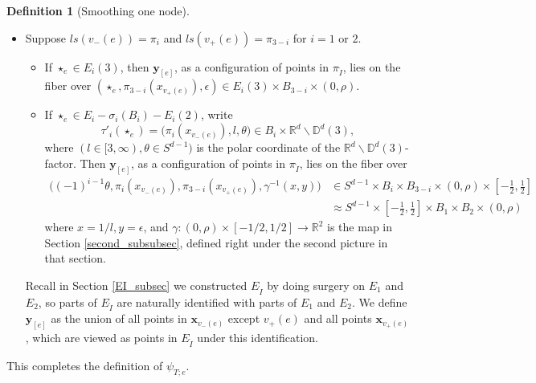 \documentclass[11pt]{article}
\theoremstyle{definition}
\newtheorem{dfn}[thm]{Definition}
\theoremstyle{remark}
\def\R{\mathbb{R}}
\def\D{\mathbb{D}}
\def\rI{{\mathring{I}}}
\def\bx{\mathbf{x}}
\def\by{\mathbf{y}}
\def\tn#1{\textnormal{#1}}
\begin{document}
\begin{dfn}[Smoothing one node]
\begin{itemize}
\[\begin{cases}
\tau'_i \quad \tn{ if }ls(v_+(e))=\pi_i, i=1 \tn{ or } 2, \tn{ and } ls(>v_+(e))=\emptyset \\
\hat\tau'_i \quad \tn{ if }ls(v_+(e))=\pi_i, i=1 \tn{ or } 2, \tn{ and } ls(>v_+(e))=\{\pi_{3-i}\} \\
\tau_\rI \quad \tn{ if }ls(v_+(e))=\pi_\rI. 
\end{cases}
\]
\item[(d)]
Suppose $ls(v_-(e))=\pi_{i}$ and $ls(v_+(e))=\pi_{3-i}$ for  $i=1$ or $2$.
\begin{itemize}
\item
If $\star_e\in E_{i}(3)$, 
then $\by_{[e]}$, as a configuration of points in $\pi_\rI$, lies on the fiber over
$(\star_e,\pi_{3-i}(x_{v_+(e)}),\epsilon)\in E_i(3)\times B_{3-i}\times(0,\rho)$.
\item
If $\star_e\in E_{i}-\sigma_{i}(B_i)-E_{i}(2)$, write 
\[
\tau'_i(\star_e)=\big(\pi_i(x_{v_-(e)}),l,\theta\big)\in B_i\times \R^d\backslash\D^d(3),
\]
where $(l\in[3,\infty), \theta\in S^{d-1})$ is the polar coordinate of the $\R^d\backslash\D^d(3)$-factor.
Then $\by_{[e]}$, as a configuration of points in $\pi_\rI$, lies on the fiber over
\begin{align*}
\big((-1)^{i-1}\theta,\pi_i(x_{v_-(e)}),\pi_{3-i}(x_{v_+(e)}),\gamma^{-1}(x,y)\big)&\in S^{d-1}\times B_i\times B_{3-i}\times(0,\rho)\times[-\frac{1}{2},\frac{1}{2}]\\
&%
{\approx} S^{d-1}\times[-\frac{1}{2},\frac{1}{2}]\times B_1\times B_{2}\times(0,\rho)
\end{align*}
where $x=1/l, y=\epsilon$, and
$\gamma:(0,\rho)\times[-1/2,1/2]\to\R^2$ is the map in Section \ref{second_subsubsec}, defined right under the second picture in that section. 
\end{itemize}
Recall in Section \ref{EI_subsec} we constructed $E_\rI$ by doing surgery on $E_1$ and $E_2$, so parts of $E_\rI$ are naturally identified with parts of $E_1$ and $E_2$.
We define $\by_{[e]}$ as the union of all points in $\bx_{v_-(e)}$ except $v_+(e)$ and all points $\bx_{v_+(e)}$, which are viewed as points in $E_\rI$ under this identification. 
\end{itemize}
This completes the definition of $\psi_{T;e}$. 
\end{dfn}
\end{document}
